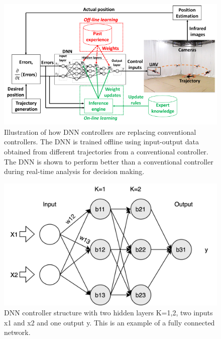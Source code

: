 \begin{figure}
	\centering
	\includegraphics[width=0.7\linewidth]{Images/DNNcontroller}
	\caption{Illustration of how DNN controllers are replacing conventional controllers. The DNN is trained offline using input-output data obtained from different trajectories from a conventional controller. The DNN is shown to perform better than a conventional controller during real-time analysis for decision making.}
	\label{fig:dnncontroller}
\end{figure}

\begin{figure}
	\centering
	\includegraphics[width=0.7\linewidth]{Images/DNNstructure}
	\caption[DNN structure]{DNN controller structure with two hidden layers K=1,2, two inputs x1 and x2 and one output y. This is an example of a fully connected network.}
	\label{fig:dnn-controller}
\end{figure}


